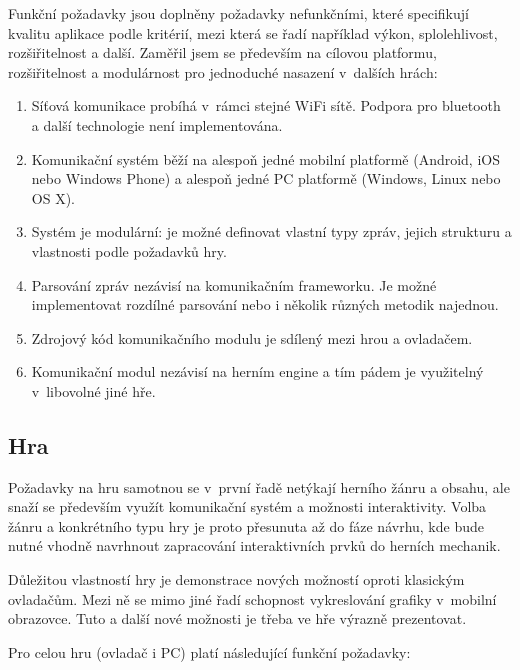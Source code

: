 \documentclass[thesis=B,czech,hidelinks]{FITthesis}[2012/06/26] %
\begin{document}
Funkční požadavky jsou doplněny požadavky nefunkčními, které specifikují kvalitu aplikace podle kritérií, mezi která se řadí například výkon, splolehlivost, rozšiřitelnost a další. Zaměřil jsem se především na cílovou platformu, rozšiřitelnost a modulárnost pro jednoduché nasazení v~dalších hrách:

\begin{enumerate}
	\item Síťová komunikace probíhá v~rámci stejné WiFi sítě. Podpora pro bluetooth a další technologie není implementována.
	\item Komunikační systém běží na alespoň jedné mobilní platformě (Android, iOS nebo Windows Phone) a alespoň jedné PC platformě (Windows, Linux nebo OS X).
	\item Systém je modulární: je možné definovat vlastní typy zpráv, jejich strukturu a vlastnosti podle požadavků hry.
	\item Parsování zpráv nezávisí na komunikačním frameworku. Je možné implementovat rozdílné parsování nebo i několik různých metodik najednou.
	\item Zdrojový kód komunikačního modulu je sdílený mezi hrou a ovladačem.
	\item Komunikační modul nezávisí na herním engine a tím pádem je využitelný v~libovolné jiné hře.
\end{enumerate}

\subsection{Hra}

Požadavky na hru samotnou se v~první řadě netýkají herního žánru a obsahu, ale snaží se především využít komunikační systém a možnosti interaktivity. Volba žánru a konkrétního typu hry je proto přesunuta až do fáze návrhu, kde bude nutné vhodně navrhnout zapracování interaktivních prvků do herních mechanik.

Důležitou vlastností hry je demonstrace nových možností oproti klasickým ovladačům. Mezi ně se mimo jiné řadí schopnost vykreslování grafiky v~mobilní obrazovce. Tuto a další nové možnosti je třeba ve hře 
výrazně prezentovat.

Pro celou hru (ovladač i PC) platí následující funkční požadavky:
\end{document}
